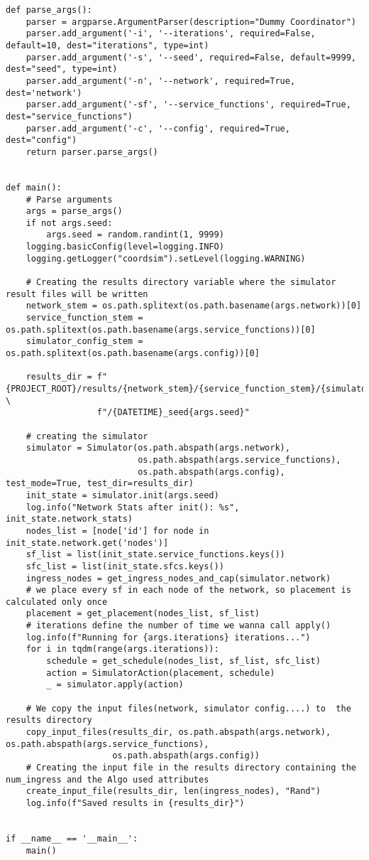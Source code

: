 \begin{lstlisting}
def parse_args():
    parser = argparse.ArgumentParser(description="Dummy Coordinator")
    parser.add_argument('-i', '--iterations', required=False, default=10, dest="iterations", type=int)
    parser.add_argument('-s', '--seed', required=False, default=9999, dest="seed", type=int)
    parser.add_argument('-n', '--network', required=True, dest='network')
    parser.add_argument('-sf', '--service_functions', required=True, dest="service_functions")
    parser.add_argument('-c', '--config', required=True, dest="config")
    return parser.parse_args()


def main():
    # Parse arguments
    args = parse_args()
    if not args.seed:
        args.seed = random.randint(1, 9999)
    logging.basicConfig(level=logging.INFO)
    logging.getLogger("coordsim").setLevel(logging.WARNING)

    # Creating the results directory variable where the simulator result files will be written
    network_stem = os.path.splitext(os.path.basename(args.network))[0]
    service_function_stem = os.path.splitext(os.path.basename(args.service_functions))[0]
    simulator_config_stem = os.path.splitext(os.path.basename(args.config))[0]

    results_dir = f"{PROJECT_ROOT}/results/{network_stem}/{service_function_stem}/{simulator_config_stem}" \
                  f"/{DATETIME}_seed{args.seed}"

    # creating the simulator
    simulator = Simulator(os.path.abspath(args.network),
                          os.path.abspath(args.service_functions),
                          os.path.abspath(args.config), test_mode=True, test_dir=results_dir)
    init_state = simulator.init(args.seed)
    log.info("Network Stats after init(): %s", init_state.network_stats)
    nodes_list = [node['id'] for node in init_state.network.get('nodes')]
    sf_list = list(init_state.service_functions.keys())
    sfc_list = list(init_state.sfcs.keys())
    ingress_nodes = get_ingress_nodes_and_cap(simulator.network)
    # we place every sf in each node of the network, so placement is calculated only once
    placement = get_placement(nodes_list, sf_list)
    # iterations define the number of time we wanna call apply()
    log.info(f"Running for {args.iterations} iterations...")
    for i in tqdm(range(args.iterations)):
        schedule = get_schedule(nodes_list, sf_list, sfc_list)
        action = SimulatorAction(placement, schedule)
        _ = simulator.apply(action)

    # We copy the input files(network, simulator config....) to  the results directory
    copy_input_files(results_dir, os.path.abspath(args.network), os.path.abspath(args.service_functions),
                     os.path.abspath(args.config))
    # Creating the input file in the results directory containing the num_ingress and the Algo used attributes
    create_input_file(results_dir, len(ingress_nodes), "Rand")
    log.info(f"Saved results in {results_dir}")


if __name__ == '__main__':
    main()

\end{lstlisting}
\newpage

